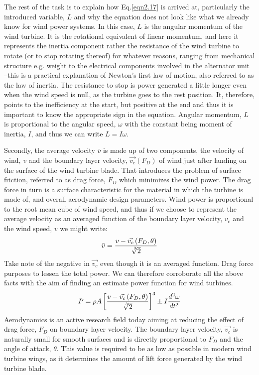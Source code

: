 \noindent The rest of the task is to explain how Eq.\eqref{eqn2.17} is arrived at, particularly the introduced variable, $L$ and why the equation does not look like what we already know for wind power systems. In this case, $L$ is the angular momentum of the wind turbine. It is the rotational equivalent of linear momentum, and here it represents the inertia component rather the resistance of the wind turbine to rotate (or to stop rotating thereof) for whatever reasons, ranging from mechanical structure e.g. weight to the electrical components involved in the alternator unit --this is a practical explanation of Newton's first law of motion, also referred to as the law of inertia. The resistance to stop is power generated a little longer even when the wind speed is null, as the turbine goes to the rest position. It, therefore, points to the inefficiency at the start, but positive at the end and thus it is important to know the appropriate sign in the equation. Angular momentum, $L$ is proportional to the angular speed, $\omega$ with the constant being moment of inertia, $I$, and thus we can write $L =I\omega$.  

\noindent Secondly, the average velocity $\bar{v}$ is made up of two components, the velocity of wind, $v$ and the boundary layer velocity, ${\vec{v_c}}\left(F_D\right)$ of wind just after landing on the surface of the wind turbine blade. That introduces the problem of surface friction, referred to as drag force, $F_D$ which minimizes the wind power. The drag force in turn is a surface characteristic for the material in which the turbine is made of, and overall aerodynamic design parameters. Wind power is proportional to the root mean cube  of wind speed, and thus if we choose to represent the average velocity as an averaged function of the boundary layer velocity, $v_c$ and the wind speed, $v$ we might write: 
\begin{equation}
\bar{v} = \frac{v -{\vec{v_c}}\left(F_D,\theta\right)}{\sqrt[\leftroot{-2}\uproot{2}3]{2}}
\label{eqn2.18}
\end{equation}
\noindent Take note of the negative in $\vec{v_c}$ even though it is an averaged function. Drag force purposes to lessen the total power. We can therefore corroborate all the above facts with the aim of finding an estimate power function for wind turbines.
\begin{equation}
P =\rho A\left[ \frac{v -{\vec{v_c}}\left(F_D,\theta\right)}{\sqrt[\leftroot{-2}\uproot{2}3]{2}}\right]^3\pm I\frac{d^2\omega}{dt^2} 
\label{eqn2.19}
\end{equation}
\noindent Aerodynamics is an active research field today aiming at reducing the effect of drag force, $F_D$ on boundary layer velocity. The boundary layer velocity, $\vec{v_c}$ is naturally small for smooth surfaces and is directly proportional to $F_D$ and the angle of attack, $\theta$. This value is required to be as low as possible in modern wind turbine wings, as it determines the amount of lift force generated by the wind turbine blade. 

